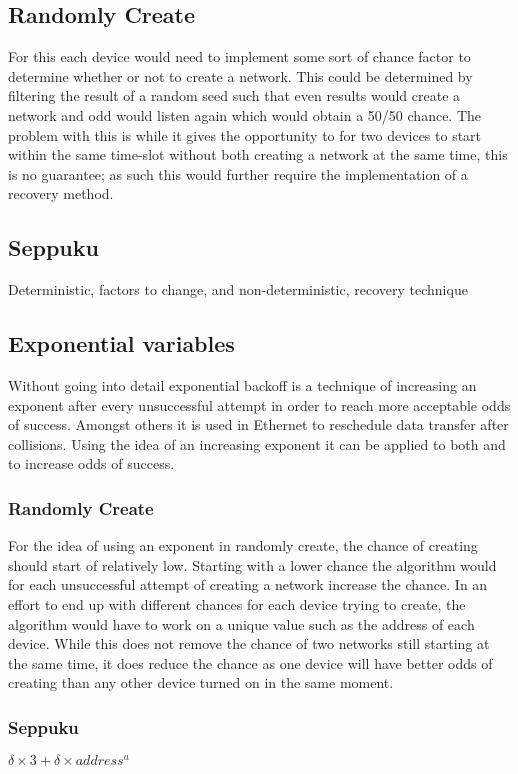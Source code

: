 \subsection{Randomly Create}\label{RCreate}
For this each device would need to implement some sort of chance factor to determine whether or not to create a network.
This could be determined by filtering the result of a random seed such that even results would create a network and odd would listen again which would obtain a 50/50 chance.
The problem with this is while it gives the opportunity to for two devices to start within the same time-slot without both creating a network at the same time, this is no guarantee; as such this would further require the implementation of a recovery method.

\subsection{Seppuku}\label{KtN}
Deterministic, factors to change, and non-deterministic, recovery technique


\subsection{Exponential variables}
Without going into detail exponential backoff is a technique of increasing an exponent after every unsuccessful attempt in order to reach more acceptable odds of success.
Amongst others it is used in Ethernet to reschedule data transfer after collisions. \citep{Ebackoff}
Using the idea of an increasing exponent it can be applied to both  and  to increase odds of success.
\subsubsection*{Randomly Create}
For the idea of using an exponent in randomly create, the chance of creating should start of relatively low.
Starting with a lower chance the algorithm would for each unsuccessful attempt of creating a network increase the chance.
In an effort to end up with different chances for each device trying to create, the algorithm would have to work on a unique value such as the address of each device.
While this does not remove the chance of two networks still starting at the same time, it does reduce the chance as one device will have better odds of creating than any other device turned on in the same moment.
\subsubsection*{Seppuku}
 $\delta \times 3 + \delta \times address^a$


